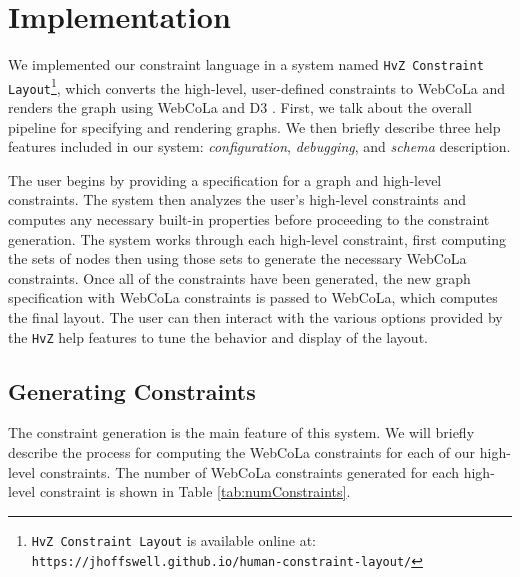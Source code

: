 \section{Implementation}
We implemented our constraint language in a system named \texttt{HvZ Constraint Layout}\footnote{\texttt{HvZ Constraint Layout} is available online at:\\ \texttt{https://jhoffswell.github.io/human-constraint-layout/}}, which converts the high-level, user-defined constraints to WebCoLa \cite{WebCoLa} and renders the graph using WebCoLa and D3 \cite{bostock:d3}. First, we talk about the overall pipeline for specifying and rendering graphs. We then briefly describe three help features included in our system: \emph{configuration}, \emph{debugging}, and \emph{schema} description.

The user begins by providing a specification for a graph and high-level constraints. The system then analyzes the user's high-level constraints and computes any necessary built-in properties before proceeding to the constraint generation. The system works through each high-level constraint, first computing the sets of nodes then using those sets to generate the necessary WebCoLa constraints. Once all of the constraints have been generated, the new graph specification with WebCoLa constraints is passed to WebCoLa, which computes the final layout. The user can then interact with the various options provided by the \texttt{HvZ} help features to tune the behavior and display of the layout.

\subsection{Generating Constraints}
The constraint generation is the main feature of this system. We will briefly describe the process for computing the WebCoLa constraints for each of our high-level constraints. The number of WebCoLa constraints generated for each high-level constraint is shown in Table \ref{tab:numConstraints}.

\newcommand{\nodePairs}{$\sum\limits_{i=1}^s n_i * \sum\limits_{j=i+1}^s n_j$}
\newcommand{\nodeInSets}{$\sum\limits_{i=1}^s n_i$}
\newcommand{\inSetPairs}{$\sum\limits_{i=1}^s {n_i \choose 2}$}

